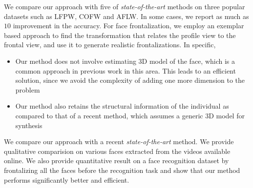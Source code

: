 We compare our approach with five of \textit{state-of-the-art} methods on
three popular datasets such as LFPW, COFW and AFLW. In some cases, we
report as much as $10$ improvement in the accuracy.
\newline
For face frontalization, we employ an exemplar based approach to find the 
transformation that relates the profile view to the frontal view, and use it 
to generate realistic frontalizations. In specific,
\begin{itemize}
\item{Our method does not involve estimating 3D model of the face,
which is a common approach in previous work in this area. This
leads to an efficient solution, since we avoid the complexity of
adding one more dimension to the problem}
\item{Our method also retains the structural information of the individual 
as compared to that of a recent method, which assumes a generic 3D model
for synthesis}
\end{itemize}

We compare our approach with a recent \textit{state-of-the-art} method. We
provide qualitative comparision on various faces extracted from the videos
available online. We also provide quantitative result on a face recognition 
dataset by frontalizing all the faces before the recognition task and show 
that our method performs significantly better and efficient.  
